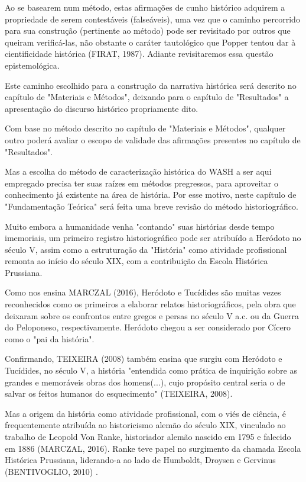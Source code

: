 Ao se basearem num método, estas afirmações de cunho histórico adquirem a propriedade de serem contestáveis (falseáveis), uma vez que o caminho percorrido para sua construção (pertinente ao método) pode ser revisitado por outros que queiram verificá-las, não obstante o caráter tautológico que Popper tentou dar à cientificidade histórica  (FIRAT, 1987). Adiante revisitaremos essa questão epistemológica.

Este caminho escolhido para a construção da narrativa histórica será descrito no capítulo de "Materiais e Métodos", deixando para o capítulo de "Resultados" a apresentação do discurso histórico propriamente dito.

Com base no método descrito no capítulo de "Materiais e Métodos", qualquer outro poderá avaliar o escopo de validade das afirmações presentes no capítulo de "Resultados".

Mas a escolha do método de caracterização histórica do WASH a ser aqui empregado precisa ter suas raízes em métodos pregressos, para aproveitar o conhecimento já existente na área de história. Por esse motivo, neste capítulo de "Fundamentação Teórica" será feita uma breve revisão do método historiográfico.

Muito embora a humanidade venha "contando" suas histórias desde tempo imemoriais, um primeiro registro historiográfico pode ser atribuído a Heródoto no século V, assim como a estruturação da "História" como atividade profissional remonta ao início do século XIX, com a contribuição da Escola Histórica Prussiana.

Como nos ensina  MARCZAL (2016),  Heródoto e Tucídides são muitas vezes reconhecidos como os primeiros a elaborar relatos historiográficos, pela obra que deixaram sobre os confrontos entre gregos e persas no século V a.c. ou da Guerra do Peloponeso, respectivamente. Heródoto chegou a ser considerado por Cícero como o "pai da história".

Confirmando, TEIXEIRA (2008)  também ensina que surgiu com Heródoto e Tucídides, no século V, a história "entendida como prática de inquirição sobre as grandes e memoráveis obras dos homens(...), cujo propósito central seria o de salvar os feitos humanos do esquecimento"  (TEIXEIRA, 2008).

Mas a origem da história como atividade profissional, com o viés de ciência, é frequentemente atribuída ao historicismo alemão do século XIX, vinculado ao trabalho de Leopold Von Ranke, historiador alemão nascido em 1795 e falecido em 1886 (MARCZAL, 2016). Ranke teve papel no surgimento da chamada Escola Histórica Prussiana, liderando-a ao lado de Humboldt, Droysen e Gervinus  (BENTIVOGLIO, 2010) .



